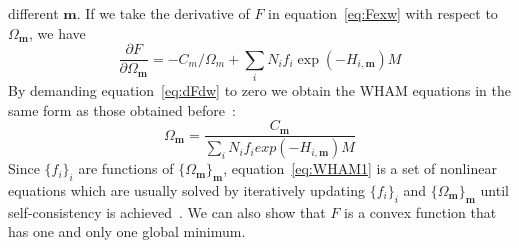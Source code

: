 different $\mathbf{m}$. If we take the derivative of $F$ in equation~\ref{eq:Fexw} with
respect to $\Omega_{\mathbf{m}}$, we have
\begin{equation}
\frac{\partial F}{\partial \Omega_{\mathbf{m}}} = -C_{m}/\Omega_{m} + \sum_{i}^{} N_{i} f_{i} \exp(-H_{i,\mathbf{m}}) M
\label{eq:dFdw}
\end{equation}
By demanding equation~\ref{eq:dFdw} to zero we obtain the WHAM equations in the same form 
as those obtained before~\cite{Zhu2012,Chodera2007,Kumar1992}:
\begin{equation}
\Omega_{\mathbf{m}} = \frac{C_{\mathbf{m}}}{\sum\limits_{i}^{} N_{i} f_{i} exp(-H_{i,\mathbf{m}}) M}
\label{eq:WHAM1}
\end{equation}
Since $\{f_{i}\}_{i}$ are functions of $\{\Omega_{\mathbf{m}}\}_{\mathbf{m}}$, equation~\ref{eq:WHAM1}
is a set of nonlinear equations which are usually solved by iteratively updating 
$\{f_{i}\}_{i}$ and $\{\Omega_{\mathbf{m}}\}_{\mathbf{m}}$ until self-consistency is 
achieved~\cite{Kumar1992,wham205}. We can also show that $F$ is a convex function that 
has one and only one global minimum.

